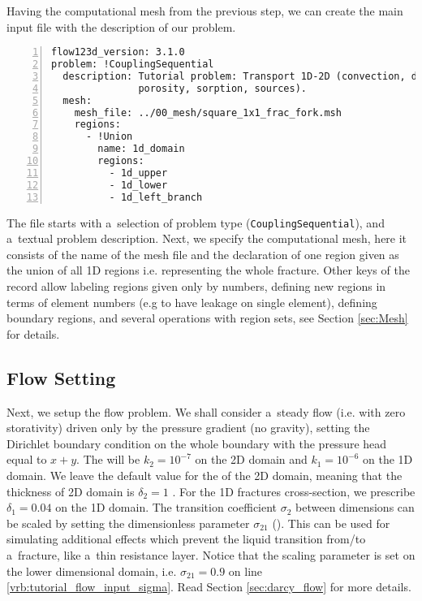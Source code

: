 Having the computational mesh from the previous step, we can create the main input file with the description of our problem. 
\begin{Verbatim}[numbers=left]
flow123d_version: 3.1.0
problem: !CouplingSequential
  description: Tutorial problem: Transport 1D-2D (convection, dual
               porosity, sorption, sources).
  mesh:
    mesh_file: ../00_mesh/square_1x1_frac_fork.msh
    regions:
      - !Union
        name: 1d_domain
        regions:
          - 1d_upper
          - 1d_lower
          - 1d_left_branch
\end{Verbatim}
The file starts with a~selection of problem type (\verb'CouplingSequential'), and a~textual problem description.
Next, we specify the computational mesh, here it consists of the name of the mesh file and the declaration of one region 
given as the union of all 1D regions i.e. representing the whole fracture. Other keys of the  record allow labeling regions given only by numbers, 
defining new regions in terms of element numbers (e.g to have leakage on single element), 
defining boundary regions, and several operations with region sets, see Section \ref{sec:Mesh} for details.

\subsection{Flow Setting}
Next, we setup the flow problem. We shall consider a~steady flow (i.e. with zero storativity) driven only by the pressure gradient (no gravity),
setting the Dirichlet boundary condition on the whole boundary with the pressure head equal to $x+y$. 
The  will be $k_2=10^{-7}$  on the 2D domain and $k_1=10^{-6}$  on the 1D domain.
We leave the default value for the  of the 2D domain,
meaning that the thickness of 2D domain is $\delta_2=1$ .
For the 1D fractures cross-section, we prescribe $\delta_1=0.04$  on the 1D domain.
The transition coefficient $\sigma_2$ between dimensions can be scaled by setting the dimensionless parameter 
$\sigma_{21}$ (). This can be used for simulating additional
effects which prevent the liquid transition from/to a~fracture, like a~thin resistance layer.
Notice that the scaling parameter is set on the lower dimensional domain, i.e. $\sigma_{21}=0.9$ on line \ref{vrb:tutorial_flow_input_sigma}.
Read Section \ref{sec:darcy_flow} for more details.

